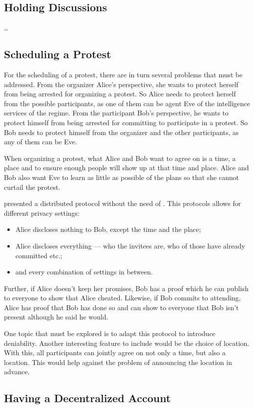 

\subsection{Holding Discussions}
\label{Discussions}

\citet{multiotr2009} \dots



\subsection{Scheduling a Protest}
\label{Scheduling}

For the scheduling of a protest, there are in turn several problems that must 
be addressed.
From the organizer Alice's perspective, she wants to protect herself from being 
arrested for organizing a protest.
So Alice needs to protect herself from the possible participants, as one of 
them can be agent Eve of the intelligence services of the regime.
From the participant Bob's perspective, he wants to protect himself from being 
arrested for committing to participate in a protest.
So Bob needs to protect himself from the organizer and the other participants, 
as any of them can be Eve.

When organizing a protest, what Alice and Bob want to agree on is a time, 
a place and to ensure enough people will show up at that time and place.
Alice and Bob also want Eve to learn as little as possible of the plans so 
that she cannot curtail the protest.

\citet{EventsInvitations} presented a distributed protocol without the need of 
.
This protocols allows for different privacy settings:
\begin{itemize}
\item Alice discloses nothing to Bob, except the time and the place;
\item Alice discloses everything --- who the invitees are, who of those have 
  already committed etc.;
\item and every combination of settings in between.
\end{itemize}
Further, if Alice doesn't keep her promises, Bob has a proof which he can 
publish to everyone to show that Alice cheated.
Likewise, if Bob commits to attending, Alice has proof that Bob has done so and 
can show to everyone that Bob isn't present although he said he would.

One topic that must be explored is to adapt this protocol to introduce 
deniability.
Another interesting feature to include would be the choice of location.
With this, all participants can jointly agree on not only a time, but also 
a location.
This would help against the problem of announcing the location in advance.



\subsection{Having a Decentralized Account}
\label{passwd}

